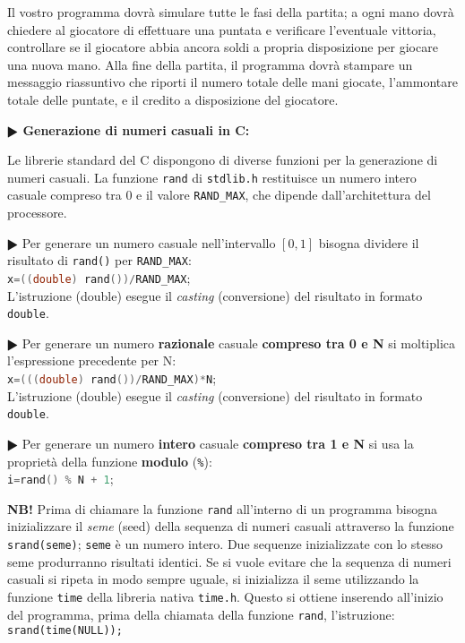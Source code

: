 \documentclass[11pt]{article}
\begin{document}
Il vostro programma dovr\`a simulare tutte le fasi della partita; a ogni mano dovr\`a chiedere al giocatore di effettuare una puntata e verificare l'eventuale vittoria, controllare se il giocatore abbia ancora soldi a propria disposizione per giocare una nuova mano. Alla fine della partita, il programma dovr\`a stampare un messaggio riassuntivo che riporti il numero totale delle mani giocate, l'ammontare totale delle puntate, e il credito a disposizione del giocatore.



\vspace{4mm}

\begin{mdframed}[backgroundcolor=panna]
\textbf{$\RHD$ Generazione di numeri casuali in C:}

Le librerie standard del C dispongono di diverse funzioni per la generazione di numeri casuali.
La funzione \texttt{rand} di \texttt{stdlib.h} restituisce un numero intero casuale compreso tra 0 e il valore \texttt{RAND\_MAX}, che dipende dall'architettura del processore.

\textbf{$\RHD$} Per generare un numero casuale nell'intervallo $ [0,1] $ 
bisogna dividere il risultato di \texttt{rand()} per
\texttt{RAND\_MAX}:
\\
\lstinline[language=c]!x=((double) rand())/RAND_MAX!;
\\
L'istruzione (double) esegue il {\em casting\/} (conversione) del risultato in formato \texttt{double}.

\textbf{$\RHD$} Per generare un numero {\bf razionale} casuale {\bf compreso tra 0 e N} si moltiplica l'espressione precedente per N:\@
\\
\lstinline[language=c]!x=(((double) rand())/RAND_MAX)*N!;
\\
L'istruzione (double) esegue il {\em casting\/} (conversione) del risultato in formato \texttt{double}.

\textbf{$\RHD$} Per generare un numero {\bf intero} casuale {\bf compreso tra 1 e N} si usa la propriet\`a della funzione
{\bf modulo} (\texttt{\%}):
\\
\lstinline[language=c]!i=rand() % N + 1!;

{\bf NB!} Prima di chiamare la funzione \texttt{rand} all'interno di un programma bisogna inizializzare il {\em seme\/} (seed) della sequenza di numeri casuali attraverso la funzione \texttt{srand(seme)}; \texttt{seme} \`e un numero intero. Due sequenze inizializzate con lo stesso seme produrranno risultati identici. Se si vuole evitare che la sequenza di numeri casuali si ripeta in modo sempre uguale, si inizializza il seme utilizzando la funzione \texttt{time} della libreria
nativa \texttt{time.h}. Questo si ottiene inserendo all'inizio del programma, prima della chiamata della funzione \texttt{rand}, l'istruzione:
\\
\texttt{srand(time(NULL));}
\\
\end{mdframed}
\end{document}
